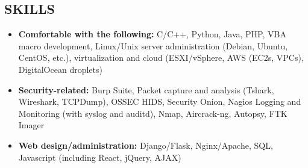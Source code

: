 \documentclass[line]{res}
\begin{document}
\begin{resume}
\section{SKILLS}
\begin{itemize}
	\item \textbf{Comfortable with the following:} C/C++, Python, Java, PHP, VBA macro development, Linux/Unix server administration (Debian, Ubuntu, CentOS, etc.), virtualization and cloud (ESXI/vSphere, AWS (EC2s, VPCs), DigitalOcean droplets)
	\item \textbf{Security-related:} Burp Suite, Packet capture and analysis (Tshark, Wireshark, TCPDump), OSSEC HIDS, Security Onion, Nagios Logging and Monitoring (with syslog and auditd), Nmap, Aircrack-ng, Autopsy, FTK Imager
	\item \textbf{Web design/administration:} Django/Flask, Nginx/Apache, SQL, Javascript (including React, jQuery, AJAX)
\end{itemize}

\end{resume}
\end{document}
